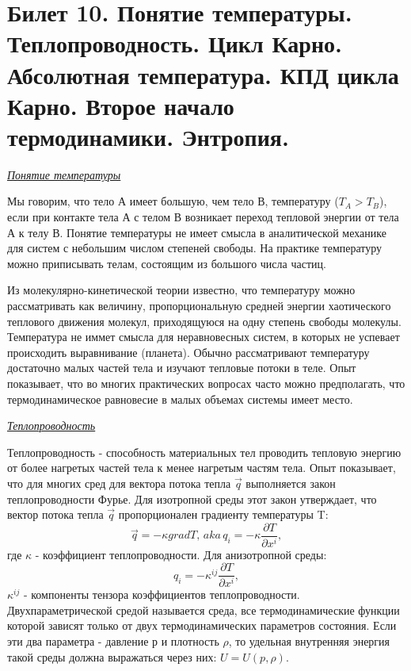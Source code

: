 \newpage
\section{Билет 10. Понятие температуры. Теплопроводность. Цикл Карно. Абсолютная температура. КПД цикла Карно. Второе начало термодинамики. Энтропия.}



\begin{center}
  \textit{\underline{Понятие температуры}}
\end{center}

Мы говорим, что тело А имеет большую, чем тело В, температуру ($T_A > T_B$), если при контакте тела А с телом В возникает переход тепловой энергии от тела А к телу В. Понятие температуры не имеет смысла в аналитической механике для систем с небольшим числом степеней свободы. На практике температуру можно приписывать телам, состоящим из большого числа частиц.

Из молекулярно-кинетической теории известно, что температуру можно рассматривать как величину, пропорциональную средней энергии хаотического теплового движения молекул, приходящуюся на одну степень свободы молекулы.  Температура не иммет смысла для неравновесных систем, в которых не успевает происходить выравнивание (планета).  Обычно рассматривают температуру достаточно малых частей тела и изучают тепловые потоки в теле. Опыт показывает, что во многих практических вопросах часто можно предполагать, что термодинамическое равновесие в малых объемах системы имеет место.


\begin{center}
  \textit{\underline{Теплопроводность}}
\end{center}

Теплопроводность - способность материальных тел проводить тепловую энергию от более нагретых частей тела к менее нагретым частям тела. Опыт показывает, что для многих сред для вектора потока тепла $\vec{q}$ выполняется закон теплопроводности Фурье. Для изотропной среды этот закон утверждает, что вектор потока тепла $\vec{q}$ пропорционален градиенту температуры T: $$\vec{q} = -\kappa grad T, \, aka \, q_i = -\kappa \frac{\partial T}{\partial x^i},$$ где $\kappa$ - коэффициент теплопроводности. Для анизотропной среды: $$q_i = -\kappa^{ij} \frac{\partial T}{\partial x^i},$$ $\kappa^{ij}$ - компоненты тензора коэффициентов теплопроводности.
Двухпараметрической средой называется среда, все термодинамические функции которой зависят только от двух термодинамических параметров состояния. Если эти два параметра - давление р и плотность $\rho$, то удельная внутренняя энергия такой среды должна выражаться через них: $U = U (p, \rho)$.

